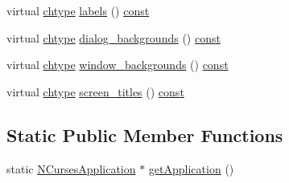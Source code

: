 \begin{DoxyCompactItemize}
\item 
virtual \hyperlink{curses_8priv_8h_ad21482314c581139d01159829e841e51}{chtype} \hyperlink{class_n_curses_application_aeec14403a63dd0c311023d196055741b}{labels} () \hyperlink{term__entry_8h_a57bd63ce7f9a353488880e3de6692d5a}{const} 
\item 
virtual \hyperlink{curses_8priv_8h_ad21482314c581139d01159829e841e51}{chtype} \hyperlink{class_n_curses_application_a0ffd4436e4e89689cf4df9bd3ba958b6}{dialog\-\_\-backgrounds} () \hyperlink{term__entry_8h_a57bd63ce7f9a353488880e3de6692d5a}{const} 
\item 
virtual \hyperlink{curses_8priv_8h_ad21482314c581139d01159829e841e51}{chtype} \hyperlink{class_n_curses_application_a834eed1189928347c09d673fb2f88153}{window\-\_\-backgrounds} () \hyperlink{term__entry_8h_a57bd63ce7f9a353488880e3de6692d5a}{const} 
\item 
virtual \hyperlink{curses_8priv_8h_ad21482314c581139d01159829e841e51}{chtype} \hyperlink{class_n_curses_application_ab2910676d361e485646b3723d8403a2e}{screen\-\_\-titles} () \hyperlink{term__entry_8h_a57bd63ce7f9a353488880e3de6692d5a}{const} 
\end{DoxyCompactItemize}
\subsection*{Static Public Member Functions}
\begin{DoxyCompactItemize}
\item 
static \hyperlink{class_n_curses_application}{N\-Curses\-Application} $\ast$ \hyperlink{class_n_curses_application_a6896c005e98c5a42eec577aca3b0f412}{get\-Application} ()
\end{DoxyCompactItemize}
